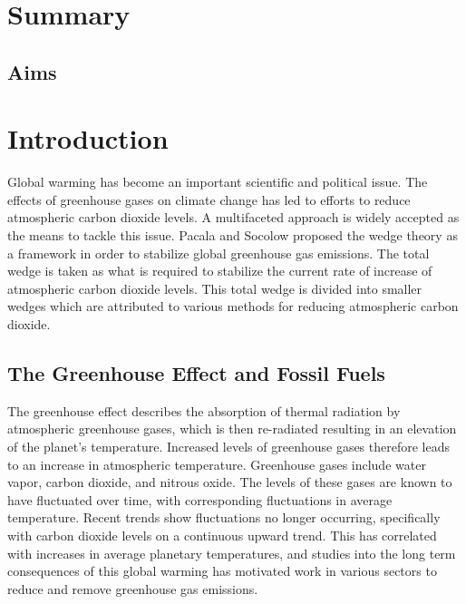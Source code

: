 \documentclass[12pt]{article}
\begin{document}
\title{}
\author{Pierre L. Bhoorasingh}
\date{\today}
\maketitle

\newpage
\tableofcontents

\newpage

\section{Summary}

\subsection{Aims}

\section{Introduction}

Global warming has become an important scientific and political issue. The effects of greenhouse gases on climate change has led to efforts to reduce atmospheric carbon dioxide levels. A multifaceted approach is widely accepted as the means to tackle this issue. Pacala and Socolow proposed the wedge theory as a framework in order to stabilize global greenhouse gas emissions. The total wedge is taken as what is required to stabilize the current rate of increase of atmospheric carbon dioxide levels. This total wedge is divided into smaller wedges which are attributed to various methods for reducing atmospheric carbon dioxide. 

\subsection{The Greenhouse Effect and Fossil Fuels}

The greenhouse effect describes the absorption of thermal radiation by atmospheric greenhouse gases, which is then re-radiated resulting in an elevation of the planet's temperature. Increased levels of greenhouse gases therefore leads to an increase in atmospheric temperature. Greenhouse gases include water vapor, carbon dioxide, and nitrous oxide. The levels of these gases are known to have fluctuated over time, with corresponding fluctuations in average temperature. Recent trends show fluctuations no longer occurring, specifically with carbon dioxide levels on a continuous upward trend. This has correlated with increases in average planetary temperatures, and studies into the long term consequences of this global warming has motivated work in various sectors to reduce and remove greenhouse gas emissions.
\end{document}
